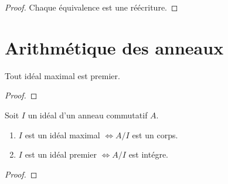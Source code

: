\ifdefined\outputproof
\begin{proof}
	Chaque équivalence est une réécriture.
\end{proof}
\fi



\section{Arithmétique des anneaux}

\begin{definition} 

\end{definition}

\begin{definition} 

\end{definition}

\begin{definition} 

\end{definition}

\begin{definition} [Corps]

\end{definition}

\begin{proposition}
	Tout idéal maximal est premier.
\end{proposition}

\ifdefined\outputproof
\begin{proof}

\end{proof}
\fi

\begin{proposition}
	Soit $I$ un idéal d'un anneau commutatif $A$.
	\begin{enumerate}
		\item $I$ est un idéal maximal $\Leftrightarrow A/I$ est un
			corps.
		\item $I$ est un idéal premier $\Leftrightarrow A/I$ est
			intégre.
	\end{enumerate}
\end{proposition}

\ifdefined\outputproof
\begin{proof}

\end{proof}
\fi

\begin{exemple}
\end{exemple}

